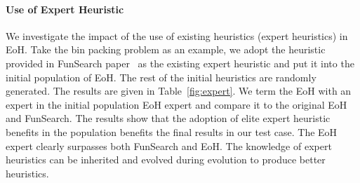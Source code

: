 \begin{table}[t]
\centering
\caption{Comparison of EoH with different LLMs. Average gap (\%) to lb on online bin packing problem 5k Weibull instances. \label{tab:LLM}}
\renewcommand{\arraystretch}{1.2}
\end{table}
    
\paragraph{Use of Expert Heuristic}
We investigate the impact of the use of existing heuristics (expert heuristics) in EoH. Take the bin packing problem as an example, we adopt the heuristic provided in FunSearch paper~\cite{romera2024mathematical} as the existing expert heuristic and put it into the initial population of EoH. The rest of the initial heuristics are randomly generated. The results are given in Table~\ref{fig:expert}. We term the EoH with an expert in the initial population EoH expert and compare it to the original EoH and FunSearch. The results show that the adoption of elite expert heuristic benefits in the population benefits the final results in our test case. The EoH expert clearly surpasses both FunSearch and EoH. The knowledge of expert heuristics can be inherited and evolved during evolution to produce better heuristics. 

\begin{table}[t]
\centering
\caption{Study of the effect of using an existing expert heuristic in EoH. Average gap (\%) to lb on online bin packing problem 5k Weibull instances.}~\label{fig:expert}
\renewcommand{\arraystretch}{1.2}
\end{table}


